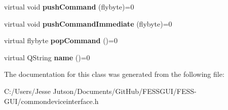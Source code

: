 \begin{DoxyCompactItemize}
virtual void {\bfseries push\+Command} (flybyte)=0
\item 
\hypertarget{class_common_device_interface_ae944b4f2b1794cf2da1b3c3af4bf0bb5}{}\label{class_common_device_interface_ae944b4f2b1794cf2da1b3c3af4bf0bb5} 
virtual void {\bfseries push\+Command\+Immediate} (flybyte)=0
\item 
\hypertarget{class_common_device_interface_ac930cbe65cec618ae2069b05e3c30a9a}{}\label{class_common_device_interface_ac930cbe65cec618ae2069b05e3c30a9a} 
virtual flybyte {\bfseries pop\+Command} ()=0
\item 
\hypertarget{class_common_device_interface_a3d80b22eafc88af3109b08491bef6e8a}{}\label{class_common_device_interface_a3d80b22eafc88af3109b08491bef6e8a} 
virtual Q\+String {\bfseries name} ()=0
\end{DoxyCompactItemize}


The documentation for this class was generated from the following file\+:\begin{DoxyCompactItemize}
\item 
C\+:/\+Users/\+Jesse Jutson/\+Documents/\+Git\+Hub/\+F\+E\+S\+S\+G\+U\+I/\+F\+E\+S\+S-\/\+G\+U\+I/commondeviceinterface.\+h\end{DoxyCompactItemize}
